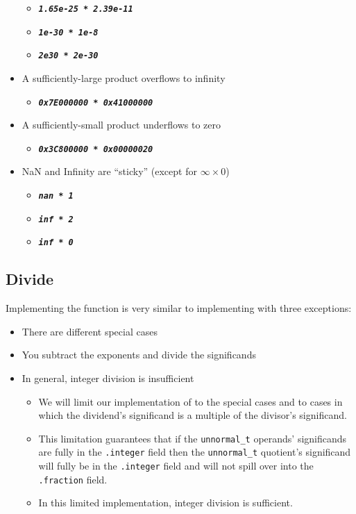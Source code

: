 \begin{itemize}
\begin{itemize}
        \item[] \texttt{\textbf{\textit{1.65e-25 * 2.39e-11}}}
        \item[] \texttt{\textbf{\textit{1e-30 * 1e-8}}}
        \item[] \texttt{\textbf{\textit{2e30 * 2e-30}}}
    \end{itemize}
    \item A sufficiently-large product overflows to infinity
    \begin{itemize}
        \item[] \texttt{\textbf{\textit{0x7E000000 * 0x41000000}}}
    \end{itemize}
    \item A sufficiently-small product underflows to zero
    \begin{itemize}
        \item[] \texttt{\textbf{\textit{0x3C800000 * 0x00000020}}}
    \end{itemize}
    \item NaN and Infinity are ``sticky'' (except for $\infty \times 0$)
    \begin{itemize}
        \item[] \texttt{\textbf{\textit{nan * 1}}}
        \item[] \texttt{\textbf{\textit{inf * 2}}}
        \item[] \texttt{\textbf{\textit{inf * 0}}}
    \end{itemize}
\end{itemize}

\subsection{Divide}

Implementing the  function is very similar to implementing  with three exceptions:

\begin{itemize}
    \item There are different special cases
    \item You subtract the exponents and divide the significands
    \item In general, integer division is insufficient
    \begin{itemize}
        \item We will limit our implementation of  to the special cases and to cases in which the dividend's significand is a multiple of the divisor's significand.
        \item This limitation guarantees that if the \lstinline{unnormal_t} operands' significands are fully in the \lstinline{.integer} field then the \lstinline{unnormal_t} quotient's significand will fully be in the \lstinline{.integer} field and will not spill over into the \lstinline{.fraction} field.
        \item In this limited implementation, integer division is sufficient.
    \end{itemize}
\end{itemize}

